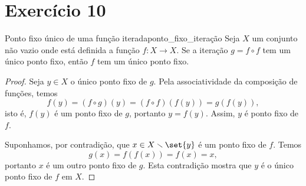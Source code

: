 \section*{Exercício 10}
\begin{lemma}{Ponto fixo único de uma função iterada}{ponto_fixo_iteração}
    Seja \(X\) um conjunto não vazio onde está definida a função \(f : X \to X\). Se a iteração \(g = f\circ f\) tem um único ponto fixo, então \(f\) tem um único ponto fixo.
\end{lemma}
\begin{proof}
    Seja \(y \in X\) o único ponto fixo de \(g\). Pela associatividade da composição de funções, temos
    \begin{equation*}
        f(y) = (f\circ g)(y) = (f\circ f)(f(y)) = g(f(y)),
    \end{equation*}
    isto é, \(f(y)\) é um ponto fixo de \(g\), portanto \(y = f(y)\). Assim, \(y\) é ponto fixo de \(f\).

    Suponhamos, por contradição, que \(x \in X\smallsetminus \set{y}\) é um ponto fixo de \(f\). Temos
    \begin{equation*}
        g(x) = f(f(x)) = f(x) = x,
    \end{equation*}
    portanto \(x\) é um outro ponto fixo de \(g\). Esta contradição mostra que \(y\) é o único ponto fixo de \(f\) em \(X\).
\end{proof}

